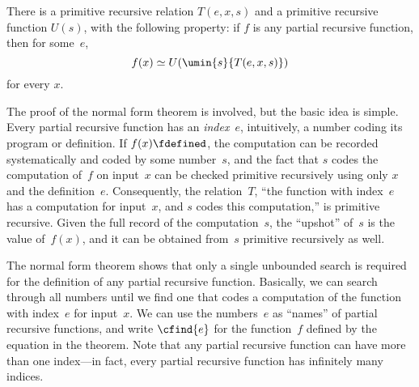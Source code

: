 \documentclass[../../../include/open-logic-section]{subfiles}
\begin{document}

\begin{thm}
There is a primitive recursive relation $T(e, x, s)$ and a primitive
recursive function $U(s)$, with the following property: if $f$ is any
partial recursive function, then for some~$e$,
\[
f(x) \simeq U(\umin{s}{T(e, x, s)})
\]
for every $x$.
\end{thm}

\begin{explain}
The proof of the normal form theorem is involved, but the basic idea
is simple.  Every partial recursive function has an \emph{index}~$e$,
intuitively, a number coding its program or definition.  If $f(x)
\fdefined$, the computation can be recorded systematically and coded
by some number~$s$, and the fact that $s$ codes the computation of~$f$
on input~$x$ can be checked primitive recursively using only $x$ and
the definition~$e$.  Consequently, the relation~$T$, ``the function
with index~$e$ has a computation for input~$x$, and $s$ codes this
computation,'' is primitive recursive. Given the full record of the
computation~$s$, the ``upshot'' of~$s$ is the value of~$f(x)$, and it
can be obtained from~$s$ primitive recursively as well.

The normal form theorem shows that only a single unbounded search is
required for the definition of any partial recursive function.
Basically, we can search through all numbers until we find one that
codes a computation of the function with index~$e$ for input~$x$. We
can use the numbers~$e$ as ``names'' of partial recursive functions,
and write $\cfind{e}$ for the function~$f$ defined by the equation in
the theorem.  Note that any partial recursive function can have more
than one index---in fact, every partial recursive function has
infinitely many indices.
\end{explain}
\end{document}
